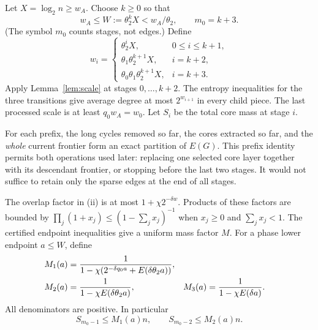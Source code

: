 Let $X=\log_2n\ge w_A$. Choose $k\ge0$ so that
\begin{equation}\label{eq:phase}
           w_A\le W:=\theta_2^kX<w_A/\theta_2,
 \qquad m_0=k+3.
\end{equation}
(The symbol $m_0$ counts stages, not edges.) Define
\begin{equation}\label{eq:schedule}
 w_i=\begin{cases}
       \theta_2^iX,&0\le i\le k+1,\\
       \theta_1\theta_2^{k+1}X,&i=k+2,\\
       \theta_0\theta_1\theta_2^{k+1}X,&i=k+3.
      \end{cases}
\end{equation}
Apply Lemma~\ref{lem:scale} at stages $0,\ldots,k+2$. The entropy
inequalities for the three transitions give average degree at most
$2^{w_{i+1}}$ in every child piece. The last processed scale is at least
$q_0w_A=w_0$. Let $S_i$ be the total core mass at stage $i$.

For each prefix, the long cycles removed so far, the cores extracted so far,
and the \emph{whole} current frontier form an exact partition of $E(G)$.
This prefix identity permits both operations used later: replacing one
selected core layer together with its descendant frontier, or stopping
before the last two stages. It would not suffice to retain only the sparse
edges at the end of all stages.

The overlap factor in (ii) is at most $1+\chi2^{-\delta w}$.
Products of these factors are bounded by
$\prod_j(1+x_j)\le(1-\sum_jx_j)^{-1}$ when $x_j\ge0$ and
$\sum_jx_j<1$. The certified endpoint inequalities give a uniform mass
factor $M$. For a phase lower endpoint $a\le W$, define
\begin{align}
 M_1(a)&=\frac1{1-\chi(2^{-\delta q_0a}+E(\delta\theta_2a))},\notag\\
 M_2(a)&=\frac1{1-\chi E(\delta\theta_2a)},&
 M_3(a)&=\frac1{1-\chi E(\delta a)}.\label{eq:phase-masses}
\end{align}
All denominators are positive. In particular
\begin{equation}\label{eq:last-core-masses}
 S_{m_0-1}\le M_1(a)n,\qquad S_{m_0-2}\le M_2(a)n.
\end{equation}

